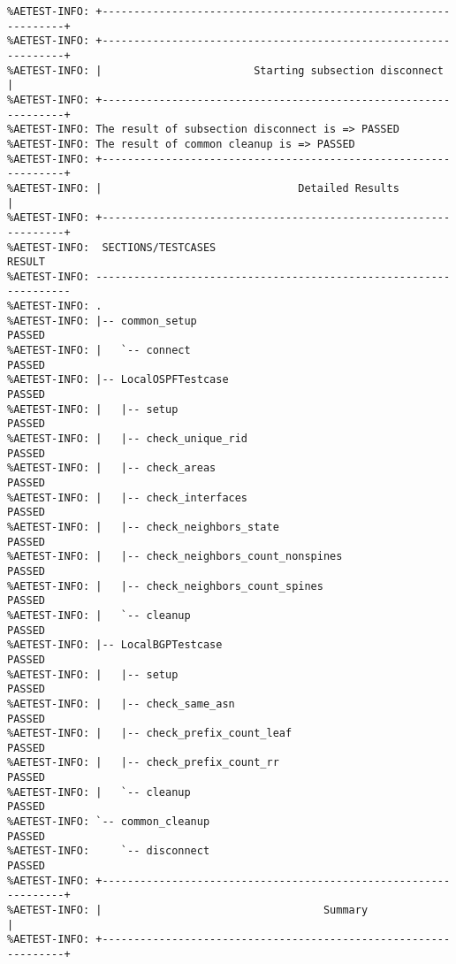 \begin{verbatim}
%AETEST-INFO: +----------------------------------------------------------------+
%AETEST-INFO: +----------------------------------------------------------------+
%AETEST-INFO: |                        Starting subsection disconnect          |
%AETEST-INFO: +----------------------------------------------------------------+
%AETEST-INFO: The result of subsection disconnect is => PASSED
%AETEST-INFO: The result of common cleanup is => PASSED
%AETEST-INFO: +----------------------------------------------------------------+
%AETEST-INFO: |                               Detailed Results                 |
%AETEST-INFO: +----------------------------------------------------------------+
%AETEST-INFO:  SECTIONS/TESTCASES                                        RESULT
%AETEST-INFO: ------------------------------------------------------------------
%AETEST-INFO: .
%AETEST-INFO: |-- common_setup                                            PASSED
%AETEST-INFO: |   `-- connect                                             PASSED
%AETEST-INFO: |-- LocalOSPFTestcase                                       PASSED
%AETEST-INFO: |   |-- setup                                               PASSED
%AETEST-INFO: |   |-- check_unique_rid                                    PASSED
%AETEST-INFO: |   |-- check_areas                                         PASSED
%AETEST-INFO: |   |-- check_interfaces                                    PASSED
%AETEST-INFO: |   |-- check_neighbors_state                               PASSED
%AETEST-INFO: |   |-- check_neighbors_count_nonspines                     PASSED
%AETEST-INFO: |   |-- check_neighbors_count_spines                        PASSED
%AETEST-INFO: |   `-- cleanup                                             PASSED
%AETEST-INFO: |-- LocalBGPTestcase                                        PASSED
%AETEST-INFO: |   |-- setup                                               PASSED
%AETEST-INFO: |   |-- check_same_asn                                      PASSED
%AETEST-INFO: |   |-- check_prefix_count_leaf                             PASSED
%AETEST-INFO: |   |-- check_prefix_count_rr                               PASSED
%AETEST-INFO: |   `-- cleanup                                             PASSED
%AETEST-INFO: `-- common_cleanup                                          PASSED
%AETEST-INFO:     `-- disconnect                                          PASSED
%AETEST-INFO: +----------------------------------------------------------------+
%AETEST-INFO: |                                   Summary                      |
%AETEST-INFO: +----------------------------------------------------------------+

\end{verbatim}
